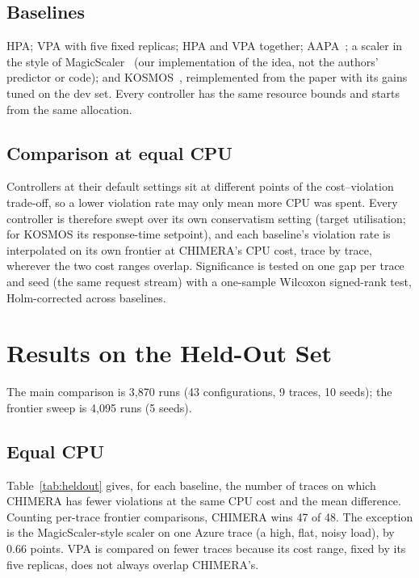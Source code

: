 \documentclass[conference]{IEEEtran}
\begin{document}
\subsection{Baselines}

HPA; VPA with five fixed replicas; HPA and VPA together; AAPA~\cite{aapa}; a scaler in the
style of MagicScaler~\cite{magicscaler} (our implementation of the idea, not the authors'
predictor or code); and KOSMOS~\cite{kosmos}, reimplemented from the paper with its gains
tuned on the dev set. Every controller has the same resource bounds and starts from the
same allocation.

\subsection{Comparison at equal CPU}

Controllers at their default settings sit at different points of the cost--violation
trade-off, so a lower violation rate may only mean more CPU was spent. Every controller is
therefore swept over its own conservatism setting (target utilisation; for KOSMOS its
response-time setpoint), and each baseline's violation rate is interpolated on its own
frontier at CHIMERA's CPU cost, trace by trace, wherever the two cost ranges overlap.
Significance is tested on one gap per trace and seed (the same request stream) with a
one-sample Wilcoxon signed-rank test, Holm-corrected across baselines.

\section{Results on the Held-Out Set}
\label{sec:heldout}

The main comparison is 3{,}870 runs (43 configurations, 9 traces, 10 seeds); the frontier
sweep is 4{,}095 runs (5 seeds).

\subsection{Equal CPU}

Table~\ref{tab:heldout} gives, for each baseline, the number of traces on which CHIMERA has
fewer violations at the same CPU cost and the mean difference. Counting per-trace frontier
comparisons, CHIMERA wins 47 of 48. The exception is the MagicScaler-style scaler on one
Azure trace (a high, flat, noisy load), by 0.66 points. VPA is compared on fewer traces
because its cost range, fixed by its five replicas, does not always overlap CHIMERA's.
\end{document}
